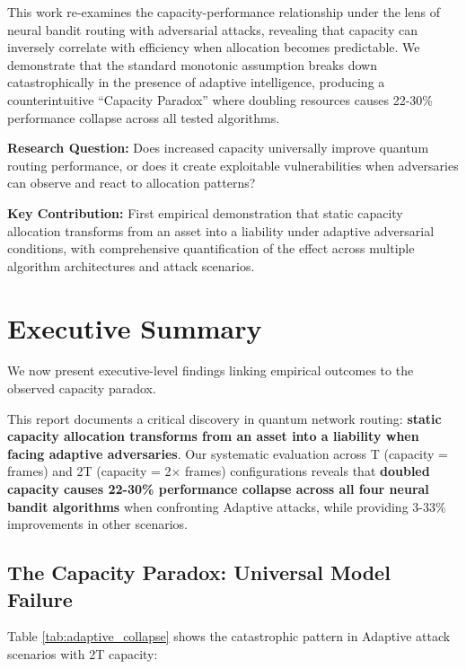 \documentclass[11pt,a4paper]{article}
\newcommand{\performance}[1]{\textcolor{performancecolor}{\textbf{#1}}}
\newcommand{\critical}[1]{\textcolor{criticalcolor}{\textbf{#1}}}
\begin{document}
This work re-examines the capacity-performance relationship under the lens of neural bandit routing with adversarial attacks, revealing that capacity can inversely correlate with efficiency when allocation becomes predictable. We demonstrate that the standard monotonic assumption breaks down catastrophically in the presence of adaptive intelligence, producing a counterintuitive ``Capacity Paradox'' where doubling resources causes 22-30\% performance collapse across all tested algorithms.

\textbf{Research Question:} Does increased capacity universally improve quantum routing performance, or does it create exploitable vulnerabilities when adversaries can observe and react to allocation patterns?

\textbf{Key Contribution:} First empirical demonstration that static capacity allocation transforms from an asset into a liability under adaptive adversarial conditions, with comprehensive quantification of the effect across multiple algorithm architectures and attack scenarios.

\section{Executive Summary}

We now present executive-level findings linking empirical outcomes to the observed capacity paradox.

This report documents a critical discovery in quantum network routing: \performance{static capacity allocation transforms from an asset into a liability when facing adaptive adversaries}. Our systematic evaluation across T (capacity = frames) and 2T (capacity = 2× frames) configurations reveals that \critical{doubled capacity causes 22-30\% performance collapse across all four neural bandit algorithms} when confronting Adaptive attacks, while providing 3-33\% improvements in other scenarios.

\subsection{The Capacity Paradox: Universal Model Failure}

Table \ref{tab:adaptive_collapse} shows the catastrophic pattern in Adaptive attack scenarios with 2T capacity:

\vspace{-0.4cm}
\end{document}
